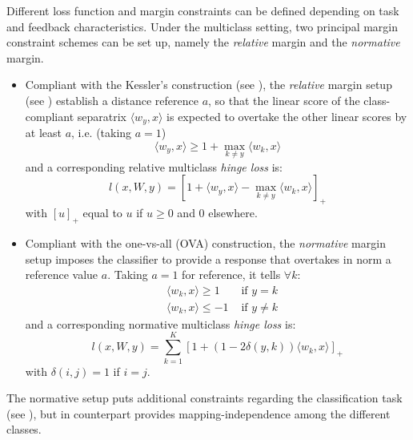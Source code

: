 \documentclass[preprint,12pt,authoryear]{elsarticle}
\begin{document}
Different loss function and margin constraints can be defined depending on task and feedback characteristics. 
Under the multiclass setting, two principal margin constraint schemes can be set up, namely the \emph{relative} margin and the \emph{normative} margin. 

\begin{itemize}
	\item Compliant with the Kessler's construction (see \cite{duda1973pattern}), the \emph{relative} margin setup (see \cite{crammer2003ultraconservative}) establish a distance reference $a$, so that the linear score of the class-compliant separatrix $\langle w_y, x\rangle$ is expected to overtake  the other linear scores by at least $a$, i.e. (taking $a=1$)
	\begin{equation}
	\label{eq:rel} \langle w_y, x \rangle \geq 1 + \max_{k \neq y} \langle w_k, x \rangle  	
	\end{equation}
	and a corresponding relative multiclass \emph{hinge loss} is:
	\begin{equation}
	\label{eq:rel-loss} l (x,W,y) =  \left[ 1 +  \langle w_y, x \rangle - \max_{k \neq y} \langle w_k, x\rangle\right]_+\end{equation}
	with $[u]_+$ equal to $u$ if $u\geq 0$ and 0 elsewhere.
	\item  Compliant with the one-vs-all (OVA) construction, the \emph{normative} margin setup imposes the classifier to provide a response that overtakes in norm a reference value $a$. Taking  $a = 1$ for reference, it tells $\forall k$: \begin{align}%
	&\langle w_k, x \rangle \geq 1 &\text{ if } y = k \label{eq:OVA-A}\\
	&\langle w_k, x \rangle \leq -1 &\text{ if }y \neq k \label{eq:OVA-B}
	\end{align}
	and a corresponding normative multiclass \emph{hinge loss} is:  
	\begin{equation}\label{eq:OVA-loss} l(x,W,y) = \sum_{k=1}^K \left[1 + (1 - 2 \delta(y,k)) \langle w_k,x \rangle\right]_+
	\end{equation}
	with $\delta(i,j) =1$ if $i = j$.
\end{itemize}


The normative setup puts additional constraints regarding the classification task (see \cite{crammer2003ultraconservative}), but in counterpart provides mapping-independence among the different classes.

\end{document}
